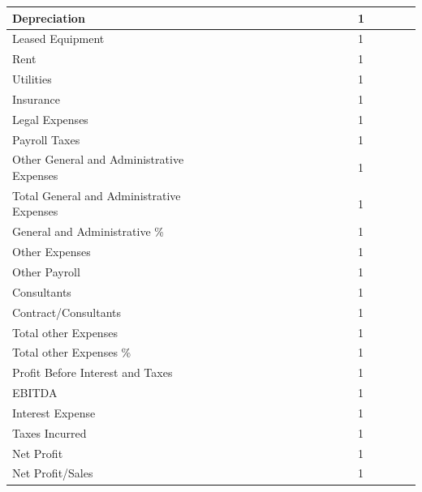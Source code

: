 \documentclass[11pt,a4paper,titlepage]{article}
\begin{document}
\begin{landscape}
\begin{scriptsize}
\begin{tabular}{ | l | l | l | l | l | l | l | l | l | l | l | l | l | l | l | l | l | l |}
  Depreciation & & & & & & & & & & & & & 1\\\hline
  Leased Equipment & & & & & & & & & & & & & 1\\\hline
  Rent & & & & & & & & & & & & & 1\\\hline
  Utilities & & & & & & & & & & & & & 1\\\hline
  Insurance & & & & & & & & & & & & & 1\\\hline
  Legal Expenses & & & & & & & & & & & & & 1\\\hline
  Payroll Taxes & & & & & & & & & & & & & 1\\\hline
  Other General and Administrative Expenses & & & & & & & & & & & & & 1\\\hline
  Total General and Administrative Expenses & & & & & & & & & & & & & 1\\\hline
  General and Administrative \% & & & & & & & & & & & & & 1\\\hline
  Other Expenses & & & & & & & & & & & & & 1\\\hline
  Other Payroll & & & & & & & & & & & & & 1\\\hline
  Consultants & & & & & & & & & & & & & 1\\\hline
  Contract/Consultants & & & & & & & & & & & & & 1\\\hline
  Total other Expenses & & & & & & & & & & & & & 1\\\hline
  Total other Expenses \% & & & & & & & & & & & & & 1\\\hline
  Profit Before Interest and Taxes & & & & & & & & & & & & & 1\\\hline
  EBITDA & & & & & & & & & & & & & 1\\\hline
  Interest Expense & & & & & & & & & & & & & 1\\\hline
  Taxes Incurred & & & & & & & & & & & & & 1\\\hline
  Net Profit & & & & & & & & & & & & & 1\\\hline
  Net Profit/Sales & & & & & & & & & & & & & 1\\\hline
\end{tabular}
\end{scriptsize}
\end{landscape}
\newpage
\thispagestyle{empty}
\end{document}
